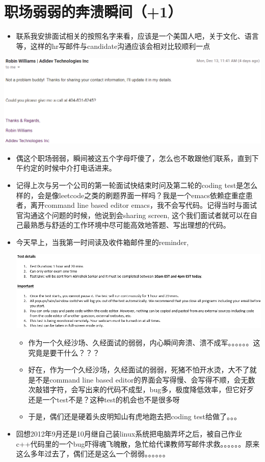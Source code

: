 \documentclass[9pt, b5paper]{article}
\begin{document}
\section{职场弱弱的奔溃瞬间（+1）}
\label{sec-2}
\begin{itemize}
\item 联系我安排面试相关的按照名字来看，应该是一个美国人吧，关于文化、语言等，这样的hr写邮件与candidate沟通应该会相对比较顺利一点
\end{itemize}

\includegraphics[width=.9\linewidth]{./pic/buddy.png}
\begin{itemize}
\item 偶这个职场弱弱，瞬间被这五个字母吓傻了，怎么也不敢跟他们联系，直到下午约定的时候中介打电话进来。
\item 记得上次与另一个公司的第一轮面试快结束时问及第二轮的coding test是怎么样的，会是像leetcode之类的刷题界面一样吗？我是一个emacs依赖症重症患者，离开command line based editor emacs，我不会写代码。记得当时与面试官沟通这个问题的时候，他说到会sharing screen, 这个我们面试者就可以在自己最熟悉与舒适的工作环境中尽可能高效地答题、写出理想的代码。
\item 今天早上，当我第一时间读及收件箱邮件里的reminder, 

\includegraphics[width=.9\linewidth]{./pic/req.png}
\begin{itemize}
\item 作为一个久经沙场、久经面试的弱弱，内心瞬间奔溃、溃不成军。。。。。。这究竟是要干什么？？？
\item 好在，作为一个久经沙场，久经面试的弱弱，死猪不怕开水烫，大不了就是不是command line based editor的界面会写得慢、会写得不顺，会无数次敲错字符，会写出来的代码不成型，bug多，极度降低效率，但它好歹还是一个test不是？这种test的机会也不是很多呀
\item 于是，偶们还是硬着头皮明知山有虎地跑去把coding test给做了。。。
\end{itemize}
\item 回想2012年9月还是10月继自己装linux系统把电脑弄坏之后，被自己作业c++代码里的一个bug吓得魂飞魄散，急忙给代课教师写邮件求救。。。。。。原来这么多年过去了，偶们还是这么一个弱弱。。。。。。
\end{itemize}
\end{document}
